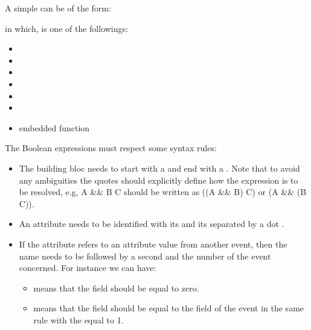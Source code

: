 A simple  can be of the form: 

\begin{center}
\end{center}

in which,  is one of the followings:

\begin{itemize}
    \item {}
    \item {}
    \item {}
    \item {}
    \item {}
    \item {}
    \item embedded function
\end{itemize}


The Boolean expressions must respect some syntax rules:

\begin{itemize}
\item The building bloc needs to start with a
\textQuote{(} and end with a \textQuote{)}. Note that to avoid any ambiguities the quotes should explicitly define how the expression is to be resolved, e.g, A \&\& B {\textbar}{\textbar} C should be written as ((A \&\& B) {\textbar}{\textbar} C) or (A \&\& (B {\textbar}{\textbar} C)).
\item An attribute needs to be identified with its  and
its  separated by a dot
.
\item If the attribute refers to an attribute value from another event,
then the name needs to be followed by a second
 and the  number of
the event concerned. For instance we can have:

\begin{itemize}
\item {}
means that the field  should be equal to zero.
\item {} means that the field  
 should be equal to the field  of the event in the same rule with the  equal to 1.
\end{itemize}
\end{itemize}


